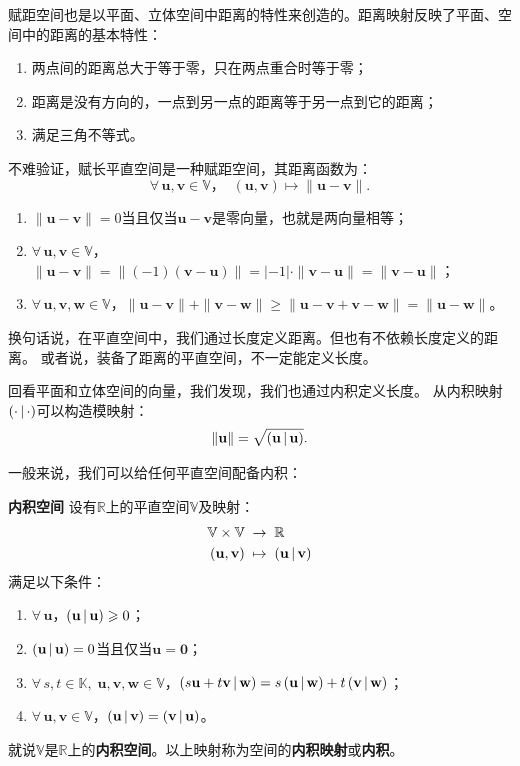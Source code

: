 \documentclass[12pt,UTF8]{ctexbook}
\begin{document}
赋距空间也是以平面、立体空间中距离的特性来创造的。距离映射反映了平面、空间中的距离的基本特性：
\begin{enumerate}
    \item 两点间的距离总大于等于零，只在两点重合时等于零；
    \item 距离是没有方向的，一点到另一点的距离等于另一点到它的距离；
    \item 满足三角不等式。
\end{enumerate}

不难验证，赋长平直空间是一种赋距空间，其距离函数为：
$$ \forall \, \mathbf{u}, \mathbf{v} \in \mathbb{V}，\;\; (\mathbf{u}, \mathbf{v}) \mapsto \| \mathbf{u} - \mathbf{v} \|.$$
\begin{enumerate}
    \item $\| \mathbf{u} - \mathbf{v} \| = 0$当且仅当$\mathbf{u} - \mathbf{v}$是零向量，也就是两向量相等；
    \item $\forall \, \mathbf{u}, \mathbf{v} \in \mathbb{V}$，$\| \mathbf{u} - \mathbf{v} \| = \| (-1) (\mathbf{v} - \mathbf{u}) \| = |-1|\cdot \| \mathbf{v} - \mathbf{u} \| = \| \mathbf{v} - \mathbf{u} \|$；
    \item $\forall \, \mathbf{u}, \mathbf{v}, \mathbf{w} \in \mathbb{V}$，$\| \mathbf{u} - \mathbf{v} \| + \| \mathbf{v} - \mathbf{w} \| \geqslant \| \mathbf{u} - \mathbf{v} + \mathbf{v} - \mathbf{w}\| = \| \mathbf{u} - \mathbf{w} \|$。
\end{enumerate}

换句话说，在平直空间中，我们通过长度定义距离。但也有不依赖长度定义的距离。
或者说，装备了距离的平直空间，不一定能定义长度。

回看平面和立体空间的向量，我们发现，我们也通过内积定义长度。
从内积映射$\displaystyle\left( \cdot \,|\, \cdot \right)$可以构造模映射：
$$ \| \mathbf{u} \| = \sqrt{\displaystyle\left( \mathbf{u} \,|\, \mathbf{u} \right)}.$$

一般来说，我们可以给任何平直空间配备内积：
\begin{df}{\textbf{内积空间}}
    设有$\mathbb{R}$上的平直空间$\mathbb{V}$及映射：
    \begin{align*}
        \mathbb{V}\times \mathbb{V} \;&\rightarrow \;\mathbb{R} \\
        (\mathbf{u}, \mathbf{v}) \;&\mapsto \; \displaystyle\left( \mathbf{u} \,|\, \mathbf{v} \right)
    \end{align*}
    满足以下条件：
    \begin{enumerate}
        \item $\forall \, \mathbf{u}$，$\displaystyle\left( \mathbf{u} \,|\, \mathbf{u} \right) \geqslant 0$；
        \item $\displaystyle\left( \mathbf{u} \,|\, \mathbf{u} \right) = 0$当且仅当$\mathbf{u} = \mathbf{0}$；
        \item $\forall \, s, t \in \mathbb{K}, \; \mathbf{u}, \mathbf{v}, \mathbf{w}\in \mathbb{V}$，$\displaystyle\left( s\mathbf{u} + t\mathbf{v} \,|\, \mathbf{w} \right) = s\displaystyle\left( \mathbf{u} \,|\, \mathbf{w} \right) + t\displaystyle\left( \mathbf{v} \,|\, \mathbf{w} \right)$；
        \item $\forall \, \mathbf{u}, \mathbf{v} \in \mathbb{V}$，$\displaystyle\left( \mathbf{u} \,|\, \mathbf{v} \right) = \displaystyle\left( \mathbf{v} \,|\, \mathbf{u} \right)$。
    \end{enumerate}
    就说$\mathbb{V}$是$\mathbb{R}$上的\textbf{内积空间}。以上映射称为空间的\textbf{内积映射}或\textbf{内积}。
\end{df}
\end{document}
